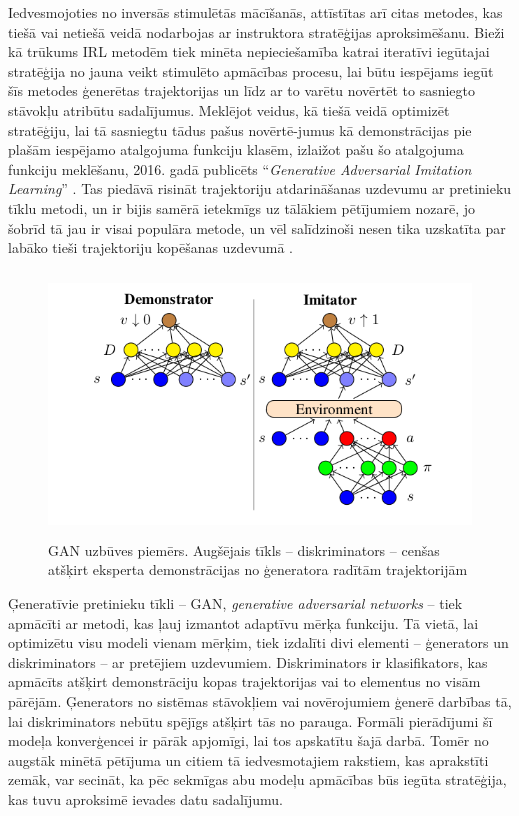 \documentclass[12pt, a4paper]{article}
\numberwithin{equation}{section} %
\begin{document}
Iedvesmojoties no inversās stimulētās mācīšanās, attīstītas arī citas metodes, kas tiešā vai netiešā veidā nodarbojas ar instruktora stratēģijas aproksimēšanu. Bieži kā trūkums IRL metodēm tiek minēta nepieciešamība katrai iteratīvi iegūtajai stratēģija no jauna veikt stimulēto apmācības procesu, lai būtu iespējams iegūt šīs metodes ģenerētas trajektorijas un līdz ar to varētu novērtēt to sasniegto stāvokļu atribūtu sadalījumus. Meklējot veidus, kā tiešā veidā optimizēt stratēģiju, lai tā sasniegtu tādus pašus novērtē-jumus kā demonstrācijas pie plašām iespējamo atalgojuma funkciju klasēm, izlaižot pašu šo atalgojuma funkciju meklēšanu, 2016. gadā publicēts ``\textit{Generative Adversarial Imitation Learning}'' \cite{ho2016generative}. Tas piedāvā risināt trajektoriju atdarināšanas uzdevumu ar pretinieku tīklu metodi, un ir bijis samērā ietekmīgs uz tālākiem pētījumiem nozarē, jo šobrīd tā jau ir visai populāra metode, un vēl salīdzinoši nesen tika uzskatīta par labāko tieši trajektoriju kopēšanas uzdevumā \cite{torabi2018generative}.

\begin{figure}[t!]
    \centering
    \includegraphics[height=7cm,page=1]{../img/GAN.png}
    \caption{GAN uzbūves piemērs. Augšējais tīkls -- diskriminators -- cenšas atšķirt eksperta demonstrācijas no ģeneratora radītām trajektorijām \cite{torabi2018generative}}
\end{figure}

Ģeneratīvie pretinieku tīkli -- GAN, \textit{generative adversarial networks} -- tiek apmācīti ar metodi, kas ļauj izmantot adaptīvu mērķa funkciju. Tā vietā, lai optimizētu visu modeli vienam mērķim, tiek izdalīti divi elementi -- ģenerators un diskriminators -- ar pretējiem uzdevumiem. Diskriminators ir klasifikators, kas apmācīts atšķirt demonstrāciju kopas trajektorijas vai to elementus no visām pārējām. Ģenerators no sistēmas stāvokļiem vai novērojumiem ģenerē darbības tā, lai diskriminators nebūtu spējīgs atšķirt tās no parauga. Formāli pierādījumi šī modeļa konverģencei ir pārāk apjomīgi, lai tos apskatītu šajā darbā. Tomēr no augstāk minētā pētījuma un citiem tā iedvesmotajiem rakstiem, kas aprakstīti zemāk, var secināt, ka pēc sekmīgas abu modeļu apmācības būs iegūta stratēģija, kas tuvu aproksimē ievades datu sadalījumu.
\end{document}
